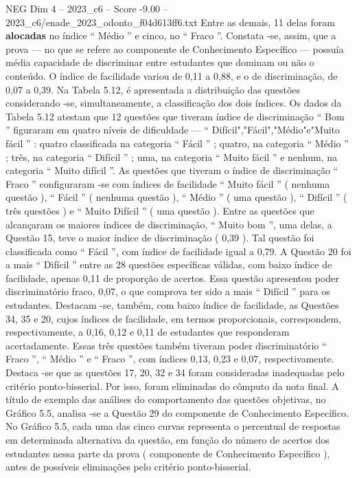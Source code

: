 \begin{textsample}{NEG Dim 4 – 2023\_c6 – Score -9.00 – 2023\_c6/enade\_2023\_odonto\_f04d613ff6.txt}
Entre as demais, 11 delas foram \textbf{alocadas} no índice “ Médio ” e cinco, no “ Fraco ”.
Constata -se, assim, que a prova — no que se refere ao componente de Conhecimento Específico — possuía média capacidade de discriminar entre estudantes que dominam ou não o conteúdo.
O índice de facilidade variou de 0,11 a 0,88, e o de discriminação, de 0,07 a 0,39.
Na Tabela 5.12, é apresentada a distribuição das questões considerando -se, simultaneamente, a classificação dos dois índices.
Os dados da Tabela 5.12 atestam que 12 questões que tiveram índice de discriminação “ Bom ” figuraram em quatro níveis de dificuldade — “ Difícil","Fácil","Médio"e"Muito fácil ” : quatro classificada na categoria “ Fácil ” ; quatro, na categoria “ Médio ” ; três, na categoria “ Difícil ” ; uma, na categoria “ Muito fácil ” e nenhum, na categoria “ Muito difícil ”.
As questões que tiveram o índice de discriminação “ Fraco ” configuraram -se com índices de facilidade “ Muito fácil ” ( nenhuma questão ), “ Fácil ” ( nenhuma questão ), “ Médio ” ( uma questão ), “ Difícil ” ( três questões ) e “ Muito Difícil ” ( uma questão ).
Entre as questões que alcançaram os maiores índices de discriminação, “ Muito bom ”, uma delas, a Questão 15, teve o maior índice de discriminação ( 0,39 ).
Tal questão foi classificada como “ Fácil ”, com índice de facilidade igual a 0,79.
A Questão 20 foi a mais “ Difícil ” entre as 28 questões específicas válidas, com baixo índice de facilidade, apenas 0,11 de proporção de acertos.
Essa questão apresentou poder discriminatório fraco, 0,07, o que comprova ter sido a mais “ Difícil ” para os estudantes.
Destacam -se, também, com baixo índice de facilidade, as Questões 34, 35 e 20, cujos índices de facilidade, em termos proporcionais, correspondem, respectivamente, a 0,16, 0,12 e 0,11 de estudantes que responderam acertadamente.
Essas três questões também tiveram poder discriminatório “ Fraco ”, “ Médio ” e “ Fraco ”, com índices 0,13, 0,23 e 0,07, respectivamente.
Destaca -se que as questões 17, 20, 32 e 34 foram consideradas inadequadas pelo critério ponto-bisserial.
Por isso, foram eliminadas do cômputo da nota final.
A título de exemplo das análises do comportamento das questões objetivas, no Gráfico 5.5, analisa -se a Questão 29 do componente de Conhecimento Específico.
No Gráfico 5.5, cada uma das cinco curvas representa o percentual de respostas em determinada alternativa da questão, em função do número de acertos dos estudantes nessa parte da prova ( componente de Conhecimento Específico ), antes de possíveis eliminações pelo critério ponto-bisserial.

\end{textsample}
